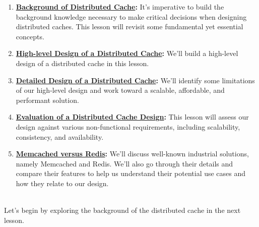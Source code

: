 \begin{enumerate}
\item
\protect{}\label{7wIiWRf8II9oh1_N5hkJu}
\href{https://www.educative.io/courses/grokking-the-system-design-interview/background-of-distributed-cache}{\textbf{Background of Distributed Cache}}\textbf{:} It's imperative to build the background knowledge necessary to make critical decisions when designing distributed caches. This lesson will revisit some fundamental yet essential concepts.
\item
\protect{}\label{OrZltW0GFbNxsAVSNIpIp}
\href{https://www.educative.io/courses/grokking-the-system-design-interview/high-level-design-of-a-distributed-cache}{\textbf{High-level Design of a Distributed Cache}}\textbf{:} We'll build a high-level design of a distributed cache in this lesson.
\item
\protect{}\label{--T7TbjorzQrzQ2XmVb8u}
\href{https://www.educative.io/courses/grokking-the-system-design-interview/detailed-design-of-a-distributed-cache}{\textbf{Detailed Design of a Distributed Cache}}\textbf{:} We'll identify some limitations of our high-level design and work toward a scalable, affordable, and performant solution.
\item
\protect{}\label{_WHPlIOByyV1TTVVSEBKf}
\href{https://www.educative.io/courses/grokking-the-system-design-interview/evaluation-of-a-distributed-caches-design}{\textbf{Evaluation of a Distributed Cache Design}}\textbf{:} This lesson will assess our design against various non-functional requirements, including scalability, consistency, and availability.
\item
\protect{}\label{MVqUvKRuzzmltNPH3w80i}
\href{https://www.educative.io/courses/grokking-the-system-design-interview/memcached-versus-redis}{\textbf{Memcached versus Redis}}\textbf{:} We'll discuss well-known industrial solutions, namely Memcached and Redis. We'll also go through their details and compare their features to help us understand their potential use cases and how they relate to our design.
\end{enumerate}
\\
Let's begin by exploring the background of the distributed cache in the next lesson.

